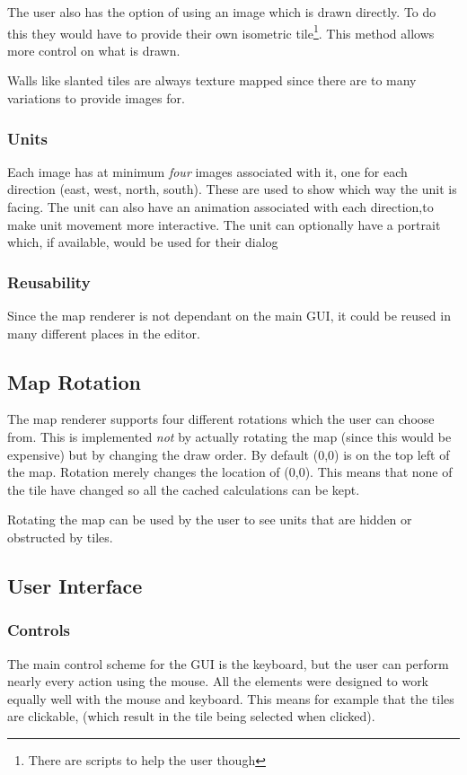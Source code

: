 The user also has the option of using an image which is drawn directly. To do this they would have to provide their own isometric tile\footnote{There are scripts to help the user though}. This method allows more control on what is drawn.  

Walls like slanted tiles are always texture mapped since there are to many variations to provide images for. 

\subsubsection{Units}
Each image has at minimum \emph{four} images associated with it, one for each direction (east, west, north, south). These are used to show which way the unit is facing. The unit can also have an animation associated with each direction,to make unit movement more interactive.  The unit can optionally have a portrait which, if available, would be used for their dialog

\subsubsection{Reusability}
Since the map renderer is not dependant on the main GUI, it could be reused in many different places in the editor. 

\subsection{Map Rotation}
The map renderer supports four different rotations which the user can choose from. This is implemented \emph{not} by actually rotating the map (since this would be expensive) but by changing the draw order. By default (0,0) is on the top left of the map. Rotation merely changes the location of (0,0). This means that none of the tile have changed so all the cached calculations can be kept. 

Rotating the map can be used by the user to see units that are hidden or obstructed by tiles. 

\clearpage
\subsection{User Interface}
\subsubsection{Controls}
The main control scheme for the GUI is the keyboard, but the user can perform nearly every action using the mouse. All the elements were designed to work equally well with the mouse and keyboard. This means for example that the tiles are clickable, (which result in the tile being selected when clicked).  

